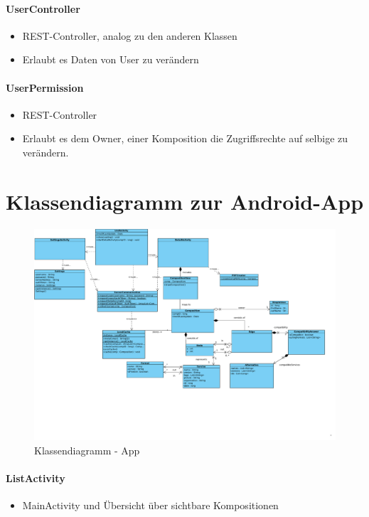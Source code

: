 \paragraph{UserController}
\begin{itemize}
	\item REST-Controller, analog zu den anderen Klassen
	\item Erlaubt es Daten von User zu verändern
\end{itemize}
\paragraph{UserPermission}
\begin{itemize}
	\item REST-Controller
	\item Erlaubt es dem Owner, einer Komposition die Zugriffsrechte auf selbige zu verändern.
\end{itemize}

\newpage
\section*{Klassendiagramm zur Android-App}

\begin{figure}[!h]
	\centering
	\includegraphics[width=\textwidth]{img/Diagramme/Klassen/App}
	\caption{Klassendiagramm - App}
	\label{fig:klassendiagramm-app}
\end{figure}

\paragraph{ListActivity}
\begin{itemize}
	\item MainActivity und Übersicht über sichtbare Kompositionen 
\end{itemize}
